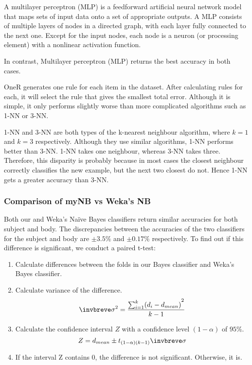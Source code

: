 \documentclass[10pt, a4paper]{article}
\begin{document}
A multilayer perceptron (MLP) is a feedforward artificial neural network model that maps sets of input data onto a set of appropriate outputs. A MLP consists of multiple layers of nodes in a directed graph, with each layer fully connected to the next one. Except for the input nodes, each node is a neuron (or processing element) with a nonlinear activation function.




In contrast, Multilayer perceptron (MLP) returns the best accuracy in both cases.

OneR generates one rule for each item in the dataset. After calculating rules for each, it will select the rule that gives the smallest total error. Although it is simple, it only performs slightly worse than more complicated algorithms such as 1-NN or 3-NN.

1-NN and 3-NN are both types of the k-nearest neighbour algorithm, where $k = 1$ and $k = 3$ respectively. Although they use similar algorithms, 1-NN performs better than 3-NN. 1-NN takes one neighbour, whereas 3-NN takes three. Therefore, this disparity is probably because in most cases the closest neighbour correctly classifies the new example, but the next two closest do not. Hence 1-NN gets a greater accuracy than 3-NN.

\subsubsection{Comparison of myNB vs Weka's NB}

Both our and Weka's Na\"ive Bayes classifiers return similar accuracies for both subject and body. The discrepancies between the accuracies of the two classifiers for the subject and body are $\pm 3.5\%$ and $\pm 0.17\%$ respectively. To find out if this difference is significant, we conduct a paired t-test:

\begin{enumerate}
\item Calculate differences between the folds in our Bayes classifier and Weka's Bayes classifier.
\item Calculate variance of the difference.
$$ \invbreve\sigma ^{2} = \frac{ {\sum\nolimits_{i=1}^k (d_{i}-d_{mean})}^2 }{k-1} $$
\item Calculate the confidence interval $Z$ with a confidence level $(1-\alpha)$ of $95\%$.
$$ Z = d_{mean} \pm t_{(1-\alpha)(k-1)} \invbreve\sigma $$
\item If the interval Z contains 0, the difference is not significant. Otherwise, it is.
\end{enumerate}
\end{document}

